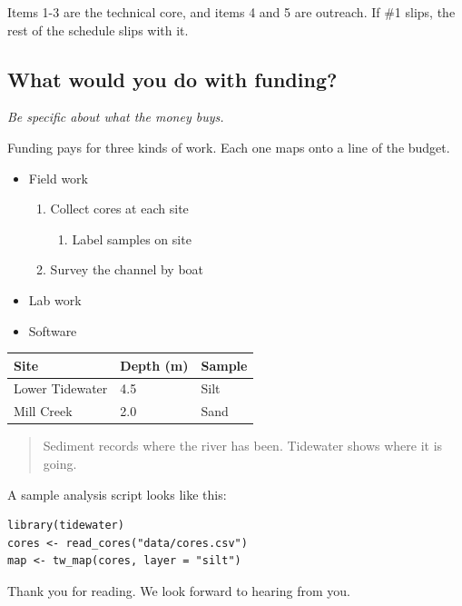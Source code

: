 Items 1-3 are the technical core, and items 4 and 5 are outreach. If \#1 slips, the rest of the schedule slips with it.

\subsection{What would you do with funding?}

\emph{Be specific about what the money buys.}

Funding pays for three kinds of work. Each one maps onto a line of the budget.

\begin{itemize}
  \item Field work
  \begin{enumerate}
    \item Collect cores at each site
    \begin{enumerate}
      \item Label samples on site
    \end{enumerate}
    \item Survey the channel by boat
  \end{enumerate}
  \item Lab work
  \item Software
\end{itemize}

\begin{tabular}{l l l}
Site & Depth (m) & Sample \\
\hline
Lower Tidewater & 4.5 & Silt \\
Mill Creek & 2.0 & Sand \\
\end{tabular}

\begin{quote}
Sediment records where the river has been. Tidewater shows where it is going.
\end{quote}

A sample analysis script looks like this:

\begin{verbatim}
library(tidewater)
cores <- read_cores("data/cores.csv")
map <- tw_map(cores, layer = "silt")
\end{verbatim}

Thank you for reading. We look forward to hearing from you.
